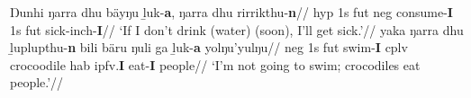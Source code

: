 \pex
\a\begingl\gla Ŋunhi ŋarra dhu bäyŋu ḻuk-\textbf{a}, ŋarra dhu rirrikthu-\textbf{n}//
\glb \gls{hyp} 1s \gls{fut} \gls{neg} consume-\textbf{I} 1s \gls{fut} sick-\gls{inch}-\textbf{I}//
\glft`If I don't drink (water) (soon), I'll get sick.'\trailingcitation{[AW~20190409]}//
\endgl
\a\begingl\gla yaka ŋarra dhu ḻuplupthu-\textbf{n} bili bäru ŋuli ga ḻuk-\textbf{a} yolŋu'yulŋu//
\glb \gls{neg} 1s \gls{fut} swim-\textbf{I} \gls{cplv} crocoodile \gls{hab} \gls{ipfv}.\textbf{I} eat-\textbf{I} people//
\glft`I'm not going to swim; crocodiles eat people.'\trailingcitation{[AW~20190428]}//
\endgl
\xe


%	
%	


